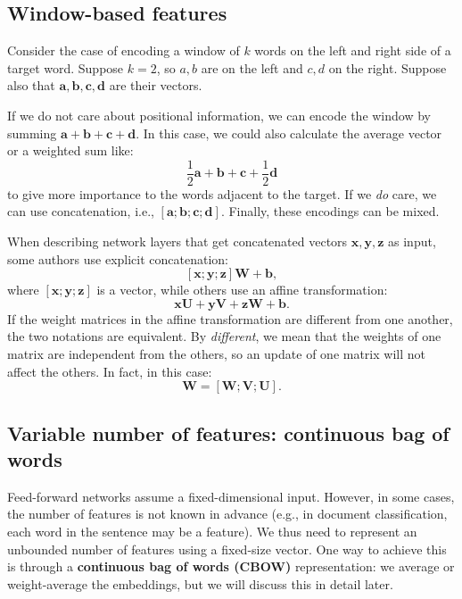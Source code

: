 \subsection{Window-based features}
Consider the case of encoding a window of \(k\) words on the left and right side of a target word. Suppose \(k=2\), so \(a, b\) are on the left and \(c, d\) on the right. Suppose also that \(\mathbf{a}, \mathbf{b}, \mathbf{c}, \mathbf{d}\) are their vectors.

If we do not care about positional information, we can encode the window by summing \(\mathbf{a} + \mathbf{b} + \mathbf{c} + \mathbf{d}\). In this case, we could also calculate the average vector or a weighted sum like:
\[
\frac{1}{2}\mathbf{a} + \mathbf{b} + \mathbf{c} + \frac{1}{2}\mathbf{d}
\]
to give more importance to the words adjacent to the target. If we \textit{do} care, we can use concatenation, i.e., \([\mathbf{a}; \mathbf{b}; \mathbf{c}; \mathbf{d}]\). Finally, these encodings can be mixed.

\begin{note}{}
    When describing network layers that get concatenated vectors \(\mathbf{x}, \mathbf{y}, \mathbf{z}\) as input, some authors use explicit concatenation:
    \[
    [\mathbf{x}; \mathbf{y}; \mathbf{z}]\mathbf{W} + \mathbf{b},
    \]
    where \([\mathbf{x}; \mathbf{y}; \mathbf{z}]\) is a vector, while others use an affine transformation:
    \[
    \mathbf{x}\mathbf{U} + \mathbf{y}\mathbf{V} + \mathbf{z}\mathbf{W} + \mathbf{b}.
    \]
    If the weight matrices in the affine transformation are different from one another, the two notations are equivalent. By \textit{different}, we mean that the weights of one matrix are independent from the others, so an update of one matrix will not affect the others. In fact, in this case:
    \[
    \mathbf{W} = [\mathbf{W}; \mathbf{V}; \mathbf{U}].
    \]
\end{note}

\subsection{Variable number of features: continuous bag of words}
Feed-forward networks assume a fixed-dimensional input. However, in some cases, the number of features is not known in advance (e.g., in document classification, each word in the sentence may be a feature). We thus need to represent an unbounded number of features using a fixed-size vector. One way to achieve this is through a \textbf{continuous bag of words (CBOW)} representation: we average or weight-average the embeddings, but we will discuss this in detail later.

